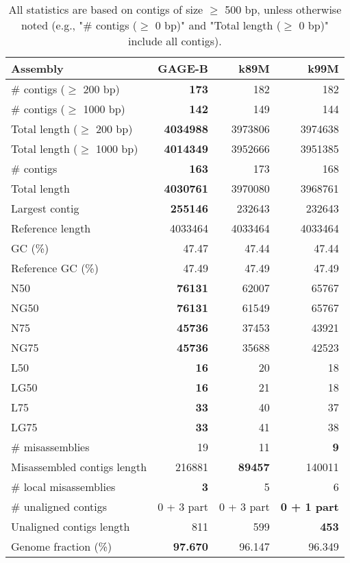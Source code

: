 \documentclass[12pt,a4paper]{article}
\begin{document}
\begin{table}[ht]
\begin{center}
\caption{All statistics are based on contigs of size $\geq$ 500 bp, unless otherwise noted (e.g., "\# contigs ($\geq$ 0 bp)" and "Total length ($\geq$ 0 bp)" include all contigs).}
\begin{tabular}{|l*{3}{|r}|}
\hline
Assembly & GAGE-B & k89M & k99M \\ \hline
\# contigs ($\geq$ 200 bp) & {\bf 173} & 182 & 182 \\ \hline
\# contigs ($\geq$ 1000 bp) & {\bf 142} & 149 & 144 \\ \hline
Total length ($\geq$ 200 bp) & {\bf 4034988} & 3973806 & 3974638 \\ \hline
Total length ($\geq$ 1000 bp) & {\bf 4014349} & 3952666 & 3951385 \\ \hline
\# contigs & {\bf 163} & 173 & 168 \\ \hline
Total length & {\bf 4030761} & 3970080 & 3968761 \\ \hline
Largest contig & {\bf 255146} & 232643 & 232643 \\ \hline
Reference length & 4033464 & 4033464 & 4033464 \\ \hline
GC (\%) & 47.47 & 47.44 & 47.44 \\ \hline
Reference GC (\%) & 47.49 & 47.49 & 47.49 \\ \hline
N50 & {\bf 76131} & 62007 & 65767 \\ \hline
NG50 & {\bf 76131} & 61549 & 65767 \\ \hline
N75 & {\bf 45736} & 37453 & 43921 \\ \hline
NG75 & {\bf 45736} & 35688 & 42523 \\ \hline
L50 & {\bf 16} & 20 & 18 \\ \hline
LG50 & {\bf 16} & 21 & 18 \\ \hline
L75 & {\bf 33} & 40 & 37 \\ \hline
LG75 & {\bf 33} & 41 & 38 \\ \hline
\# misassemblies & 19 & 11 & {\bf 9} \\ \hline
Misassembled contigs length & 216881 & {\bf 89457} & 140011 \\ \hline
\# local misassemblies & {\bf 3} & 5 & 6 \\ \hline
\# unaligned contigs & 0 + 3 part & 0 + 3 part & {\bf 0 + 1 part} \\ \hline
Unaligned contigs length & 811 & 599 & {\bf 453} \\ \hline
Genome fraction (\%) & {\bf 97.670} & 96.147 & 96.349 \\ \hline

\end{tabular}
\end{center}
\end{table}
\end{document}
